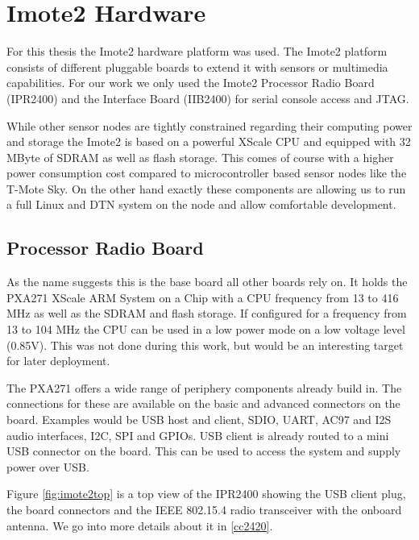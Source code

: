 \chapter{Imote2 Hardware}
For this thesis the Imote2 hardware platform was used. The Imote2 platform
consists of different pluggable boards to extend it with sensors or multimedia
capabilities. For our work we only used the Imote2 Processor Radio Board
(IPR2400) and the Interface Board (IIB2400) for serial console access and JTAG.

While other sensor nodes are tightly constrained regarding their computing power
and storage the Imote2 is based on a powerful XScale CPU and equipped with 32
MByte of SDRAM as well as flash storage. This comes of course with a higher power
consumption cost compared to microcontroller based sensor nodes like the T-Mote
Sky. On the other hand exactly these components are allowing us to run a full
Linux and DTN system on the node and allow comfortable development.

\section{Processor Radio Board}
As the name suggests this is the base board all other boards rely on. It holds
the PXA271 XScale ARM System on a Chip with a CPU frequency from 13 to 416 MHz
as well as the SDRAM and flash storage. If configured for a frequency from 13
to 104 MHz the CPU can be used in a low power mode on a low voltage level
(0.85V). This was not done during this work, but would be an interesting target
for later deployment.

The PXA271 offers a wide range of periphery components already build in. The
connections for these are available on the basic and advanced connectors on the
board. Examples would be USB host and client, SDIO, UART, AC97 and I2S audio
interfaces, I2C, SPI and GPIOs. USB client is already routed to a mini USB
connector on the board. This can be used to access the system and supply power
over USB.

Figure \ref{fig:imote2top} is a top view of the IPR2400 showing the USB client plug,
the board connectors and the IEEE 802.15.4 radio transceiver with the onboard
antenna. We go into more details about it in \ref{cc2420}.

